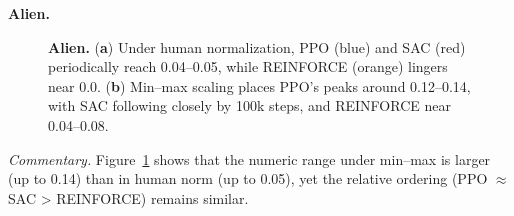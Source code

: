\noindent \textbf{Alien.}
\begin{figure} 
	\centering
	\quad
	\caption{\textbf{Alien.} 
		(\textbf{a}) Under human normalization, PPO (blue) and SAC (red) periodically reach 0.04--0.05, while REINFORCE (orange) lingers near 0.0.
		(\textbf{b}) Min--max scaling places PPO’s peaks around 0.12--0.14, with SAC following closely by 100k steps, and REINFORCE near 0.04--0.08.}
	\label{fig:alien_combined}
\end{figure}

\noindent
\emph{Commentary.} Figure~\ref{fig:alien_combined} shows that the numeric range under min--max is larger (up to 0.14) than in human norm (up to 0.05), yet the relative ordering (PPO \(\approx\) SAC > REINFORCE) remains similar.

\medskip

